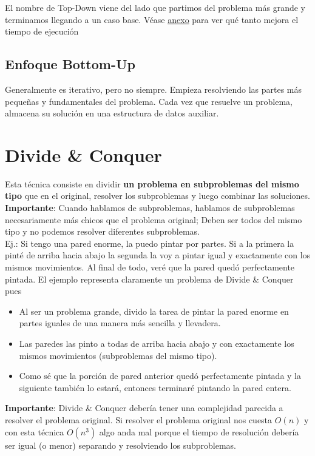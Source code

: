 \documentclass[10pt,a4paper]{article}
\begin{document}
El nombre de Top-Down viene del lado que partimos del problema más grande y terminamos llegando a un caso base.
Véase \hyperref[subsec:top_down_programacion_dinamica]{\underline{anexo}} para ver qué tanto mejora el tiempo de ejecución
\subsection*{Enfoque Bottom-Up}
Generalmente es iterativo, pero no siempre. Empieza resolviendo las partes más pequeñas y fundamentales del problema. Cada vez que resuelve un problema, almacena su solución en una estructura de datos auxiliar.
\section*{Divide \& Conquer}
Esta técnica consiste en dividir \textbf{un problema en subproblemas
 del mismo tipo} que en el original, resolver los subproblemas y luego combinar las soluciones. \\

\textbf{Importante}: Cuando hablamos de subproblemas, hablamos de subproblemas necesariamente más chicos que el problema original; Deben ser todos del mismo tipo y no podemos resolver diferentes subproblemas. \\

Ej.: Si tengo una pared enorme, la puedo pintar por partes. Si a la primera la pinté de arriba hacia abajo la segunda la voy a pintar igual y exactamente con los mismos movimientos. Al final de todo, veré que la pared quedó perfectamente pintada.
El ejemplo representa claramente un problema de Divide \& Conquer pues
\begin{itemize}
    \item Al ser un problema grande, divido la tarea de pintar la pared enorme en partes iguales de una manera más sencilla y llevadera.
    \item Las paredes las pinto a todas de arriba hacia abajo y con exactamente los mismos movimientos (subproblemas del mismo tipo).
    \item Como sé que la porción de pared anterior quedó perfectamente pintada y la siguiente también lo estará, entonces terminaré pintando la pared entera.
\end{itemize}

\textbf{Importante}: Divide \& Conquer debería tener una complejidad parecida a resolver el problema original. Si resolver el problema original nos cuesta $O(n)$ y con esta técnica $O(n^{3})$ algo anda mal porque el tiempo de resolución debería ser igual (o menor) separando y resolviendo los subproblemas.
\end{document}
